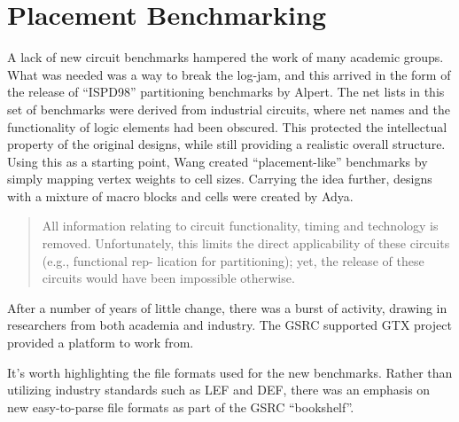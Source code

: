 \documentclass[sigconf]{acmart}
\begin{document}
\section{Placement Benchmarking}

A lack of new circuit benchmarks hampered the work of many academic
groups.  What was needed was a way to break the log-jam, and this
arrived in the form of the release of ``ISPD98'' partitioning
benchmarks by Alpert\cite{Alpert980080}.  The net lists in this set of
benchmarks were derived from industrial circuits, where net names and
the functionality of logic elements had been obscured.  This protected
the intellectual property of the original designs, while still providing
a realistic overall structure.  Using this as a starting point,
Wang\cite{Wang000260} created ``placement-like'' benchmarks by simply
mapping vertex weights to cell sizes.  Carrying the idea further,
designs with a mixture of macro blocks and cells were created by
Adya\cite{Adya020012}.


\begin{quote}
All information relating to circuit functionality, timing and technology is removed. Unfortunately, this limits the direct applicability of these circuits (e.g., functional rep- lication for partitioning); yet, the release of these circuits would have been impossible otherwise. \cite{Alpert980080}
\end{quote}


After a number of years of little change, there was a burst of
activity, drawing in researchers from both academia and industry.  The
GSRC supported GTX project \cite{Caldwell000693} provided a platform
to work from.





It's worth highlighting the file formats used for the new benchmarks.
Rather than utilizing industry standards such as LEF and DEF,
there was an emphasis on new easy-to-parse file formats as part
of the GSRC ``bookshelf''\cite{umichbookshelf}.
\end{document}
